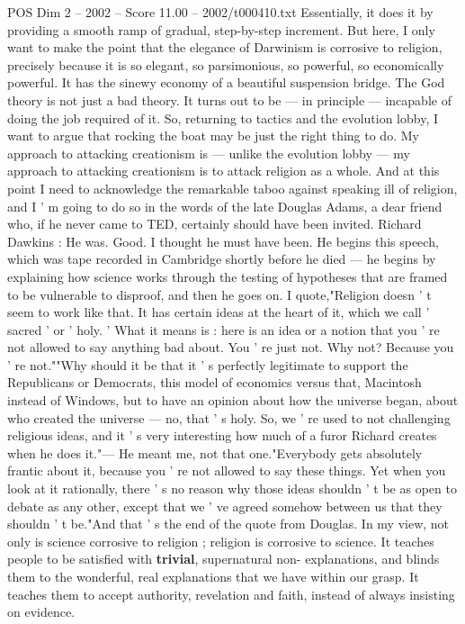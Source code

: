 \begin{textsample}{POS Dim 2 – 2002 – Score 11.00 – 2002/t000410.txt}
Essentially, it does it by providing a smooth ramp of gradual, step-by-step increment.
But here, I only want to make the point that the elegance of Darwinism is corrosive to religion, precisely because it is so elegant, so parsimonious, so powerful, so economically powerful.
It has the sinewy economy of a beautiful suspension bridge.
The God theory is not just a bad theory.
It turns out to be — in principle — incapable of doing the job required of it.
So, returning to tactics and the evolution lobby, I want to argue that rocking the boat may be just the right thing to do.
My approach to attacking creationism is — unlike the evolution lobby — my approach to attacking creationism is to attack religion as a whole.
And at this point I need to acknowledge the remarkable taboo against speaking ill of religion, and I ' m going to do so in the words of the late Douglas Adams, a dear friend who, if he never came to TED, certainly should have been invited.
Richard Dawkins : He was.
Good.
I thought he must have been.
He begins this speech, which was tape recorded in Cambridge shortly before he died — he begins by explaining how science works through the testing of hypotheses that are framed to be vulnerable to disproof, and then he goes on.
I quote,"Religion doesn ' t seem to work like that.
It has certain ideas at the heart of it, which we call ' sacred ' or ' holy. ' What it means is : here is an idea or a notion that you ' re not allowed to say anything bad about.
You ' re just not.
Why not?
Because you ' re not.""Why should it be that it ' s perfectly legitimate to support the Republicans or Democrats, this model of economics versus that, Macintosh instead of Windows, but to have an opinion about how the universe began, about who created the universe — no, that ' s holy.
So, we ' re used to not challenging religious ideas, and it ' s very interesting how much of a furor Richard creates when he does it."— He meant me, not that one."Everybody gets absolutely frantic about it, because you ' re not allowed to say these things.
Yet when you look at it rationally, there ' s no reason why those ideas shouldn ' t be as open to debate as any other, except that we ' ve agreed somehow between us that they shouldn ' t be."And that ' s the end of the quote from Douglas.
In my view, not only is science corrosive to religion ; religion is corrosive to science.
It teaches people to be satisfied with \textbf{trivial}, supernatural non- explanations, and blinds them to the wonderful, real explanations that we have within our grasp.
It teaches them to accept authority, revelation and faith, instead of always insisting on evidence.

\end{textsample}
